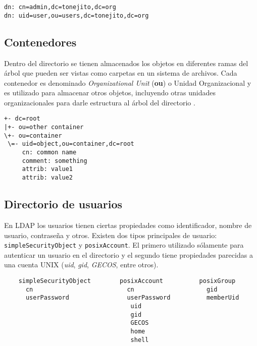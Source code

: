 {
\scriptsize
\linespread{1}
\begin{center}
  \verb|dn: cn=admin,dc=tonejito,dc=org|
  \\
  \verb|dn: uid=user,ou=users,dc=tonejito,dc=org|
\end{center}
}

  \subsection{Contenedores}

Dentro del directorio se tienen almacenados los objetos en diferentes ramas del \'{a}rbol que pueden ser vistas como carpetas en un sistema de archivos. Cada contenedor es denominado \textit{Organizational Unit} (\textbf{ou}) o Unidad Organizacional y es utilizado para almacenar otros objetos, incluyendo otras unidades organizacionales para darle estructura al \'{a}rbol del directorio \cite{_appendix_????}.

{
\scriptsize
\linespread{1}
\begin{verbatim}
+- dc=root
|+- ou=other container
\+- ou=container
 \=- uid=object,ou=container,dc=root
     cn: common name
     comment: something
     attrib: value1
     attrib: value2
\end{verbatim}
}

  \subsection {Directorio de usuarios}

En \textsc{LDAP}  los usuarios tienen ciertas propiedades como identificador, nombre de usuario, contrase\~{n}a y otros. Existen dos tipos principales de usuario: \verb/simpleSecurityObject/ y \verb/posixAccount/. El primero utilizado s\'{o}lamente para autenticar un usuario en el directorio y el segundo tiene propiedades parecidas a una cuenta \textsc{UNIX} (\textit{uid}, \textit{gid}, \textit{GECOS}, entre otros).

{
\scriptsize
\linespread{1}
\begin{verbatim}
    simpleSecurityObject        posixAccount          posixGroup
      cn                          cn                    gid
      userPassword                userPassword          memberUid
                                   uid                
                                   gid                
                                   GECOS              
                                   home               
                                   shell              
\end{verbatim}
}

